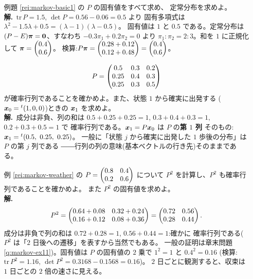 \begin{rei}[例題・基本(固有値と定常分布)]\label{rei:markov-basic2}
例題 \ref{rei:markov-basic1} の $P$ の固有値をすべて求め、
定常分布を求めよ。\\
\textbf{解.}\ $\mathrm{tr}\,P = 1.5$, $\det P = 0.56 - 0.06 = 0.5$ より
固有多項式は $\lambda^2 - 1.5\lambda + 0.5 = (\lambda - 1)(\lambda - 0.5)$。
固有値は $1$ と $0.5$ である。定常分布は
$(P - E)\bm{\pi} = \bm{0}$、すなわち $-0.3\pi_1 + 0.2\pi_2 = 0$ より
$\pi_1 : \pi_2 = 2 : 3$。和を $1$ に正規化して
$\bm{\pi} = \begin{pmatrix}0.4 \\ 0.6\end{pmatrix}$。
検算:$P\bm{\pi} = \begin{pmatrix}0.28 + 0.12 \\ 0.12 + 0.48\end{pmatrix} = \begin{pmatrix}0.4 \\ 0.6\end{pmatrix}$。
\end{rei}

\begin{rei}[例題・基本($3$ 状態の読み取り)]\label{rei:markov-basic3}
\[
P = \begin{pmatrix}0.5 & 0.3 & 0.2 \\ 0.25 & 0.4 & 0.3 \\ 0.25 & 0.3 & 0.5\end{pmatrix}
\]
が確率行列であることを確かめよ。また、状態 $1$ から確実に出発する
($\bm{x}_0 = {}^t(1, 0, 0)$)ときの $\bm{x}_1$ を求めよ。\\
\textbf{解.}\ 成分は非負、列の和は
$0.5 + 0.25 + 0.25 = 1$, $0.3 + 0.4 + 0.3 = 1$, $0.2 + 0.3 + 0.5 = 1$ で
確率行列である。$\bm{x}_1 = P\bm{x}_0$ は $P$ の\textbf{第 $1$ 列}
そのもの:$\vect{x}_1 = {}^t(0.5,\ 0.25,\ 0.25)$。
一般に「状態 $j$ から確実に出発した $1$ 歩後の分布」は $P$ の第 $j$ 列である
――行列の列の意味(基本ベクトルの行き先)そのままである。
\end{rei}

\begin{rei}[例題・標準($2$ ステップ遷移)]\label{rei:markov-std1}
例 \ref{rei:markov-weather} の $P = \begin{pmatrix}0.8 & 0.4 \\ 0.2 & 0.6\end{pmatrix}$ について
$P^2$ を計算し、$P^2$ も確率行列であることを確かめよ。
また $P^2$ の固有値を求めよ。\\
\textbf{解.}\
\[
P^2 = \begin{pmatrix}0.64 + 0.08 & 0.32 + 0.24 \\ 0.16 + 0.12 & 0.08 + 0.36\end{pmatrix}
= \begin{pmatrix}0.72 & 0.56 \\ 0.28 & 0.44\end{pmatrix}.
\]
成分は非負で列の和は $0.72 + 0.28 = 1$, $0.56 + 0.44 = 1$:確かに
確率行列である($P^2$ は「$2$ 日後への遷移」を表すから当然でもある。
一般の証明は章末問題 \ref{q:markov-ex11})。固有値は
$P$ の固有値の $2$ 乗で $1^2 = 1$ と $0.4^2 = 0.16$
(検算:$\mathrm{tr}\,P^2 = 1.16$, $\det P^2 = 0.3168 - 0.1568 = 0.16$)。
$2$ 日ごとに観測すると、収束は $1$ 日ごとの $2$ 倍の速さに見える。
\end{rei}

